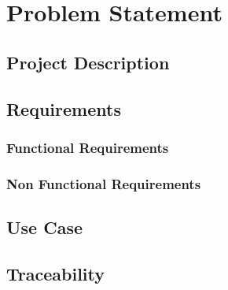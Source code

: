 \chapter{Problem Statement}\label{chap:analysis}

\section{Project Description}


\section{Requirements}

\subsection{Functional Requirements}
\subsection{Non Functional Requirements}


\section{Use Case}

\section{Traceability}
